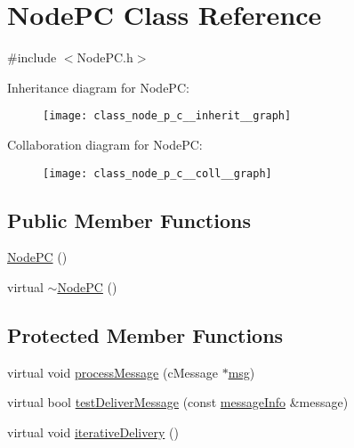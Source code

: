 \hypertarget{class_node_p_c}{}\section{Node\+PC Class Reference}
\label{class_node_p_c}


{\ttfamily \#include $<$Node\+P\+C.\+h$>$}



Inheritance diagram for Node\+PC\+:\nopagebreak
\begin{figure}[H]
\begin{center}
\leavevmode
\texttt{[image: class\_node\_p\_c\_\_inherit\_\_graph]}
\end{center}
\end{figure}


Collaboration diagram for Node\+PC\+:\nopagebreak
\begin{figure}[H]
\begin{center}
\leavevmode
\texttt{[image: class\_node\_p\_c\_\_coll\_\_graph]}
\end{center}
\end{figure}
\subsection*{Public Member Functions}
\begin{DoxyCompactItemize}
\item 
\hyperlink{class_node_p_c_a0b937d3f3d409fd1a8d1c15170d97675}{Node\+PC} ()
\item 
virtual \hyperlink{class_node_p_c_a823ec7244202157115f6d587c0c565dc}{$\sim$\+Node\+PC} ()
\end{DoxyCompactItemize}
\subsection*{Protected Member Functions}
\begin{DoxyCompactItemize}
\item 
virtual void \hyperlink{class_node_p_c_aa5fedc4136104a06e2f1131f1ba16b0e}{process\+Message} (c\+Message $\ast$\hyperlink{_controller_8h_afa0f3b802fbc219228f7bb97996fa558}{msg})
\item 
virtual bool \hyperlink{class_node_p_c_a54731196935596e0c6f094a5a8420134}{test\+Deliver\+Message} (const \hyperlink{structures_8h_a7e7bdc1d2fff8a9436f2f352b2711ed6}{message\+Info} \&message)
\item 
virtual void \hyperlink{class_node_p_c_a7ac363db597ebadd3b18dd4343440aa1}{iterative\+Delivery} ()
\end{DoxyCompactItemize}
